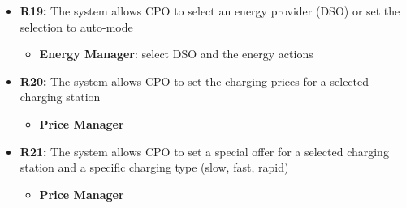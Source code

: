 \begin{itemize}
\begin{itemize}
          \end{itemize}
          \item \textbf{R19:} The system allows CPO to select an energy provider (DSO) or set the selection to auto-mode
          \begin{itemize}
              \item \textbf{Energy Manager}: select DSO and the energy actions
              
          \end{itemize}
          \item \textbf{R20:} The system allows CPO to set the charging prices for a selected charging station
          \begin{itemize}
              \item \textbf{Price Manager}
          \end{itemize}
          \item \textbf{R21:} The system allows CPO to set a special offer for a selected charging station and a specific charging type (slow, fast, rapid)
          \begin{itemize}
              \item \textbf{Price Manager}
              
          \end{itemize}
\end{itemize}

